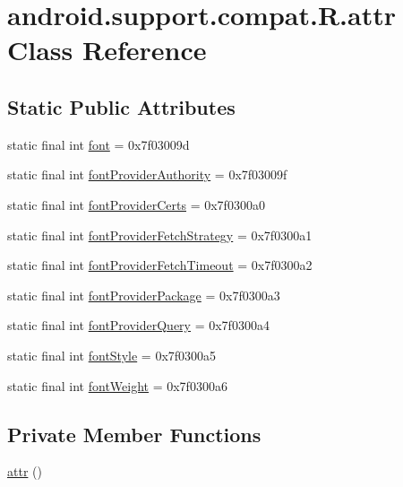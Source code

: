 \hypertarget{classandroid_1_1support_1_1compat_1_1_r_1_1attr}{}\section{android.\+support.\+compat.\+R.\+attr Class Reference}
\label{classandroid_1_1support_1_1compat_1_1_r_1_1attr}
\subsection*{Static Public Attributes}
\begin{DoxyCompactItemize}
\item 
static final int \mbox{\hyperlink{classandroid_1_1support_1_1compat_1_1_r_1_1attr_a81787f6b5888bbbadbced1dcdf540898}{font}} = 0x7f03009d
\item 
static final int \mbox{\hyperlink{classandroid_1_1support_1_1compat_1_1_r_1_1attr_a385b42c0dfc03b03c265fcfd7769c4bd}{font\+Provider\+Authority}} = 0x7f03009f
\item 
static final int \mbox{\hyperlink{classandroid_1_1support_1_1compat_1_1_r_1_1attr_a596b9b8b873c6ad0f117df870c8c3f21}{font\+Provider\+Certs}} = 0x7f0300a0
\item 
static final int \mbox{\hyperlink{classandroid_1_1support_1_1compat_1_1_r_1_1attr_aef6cba42cf72879fa76c23ac333b803c}{font\+Provider\+Fetch\+Strategy}} = 0x7f0300a1
\item 
static final int \mbox{\hyperlink{classandroid_1_1support_1_1compat_1_1_r_1_1attr_ac799f7df13e58e586ee80b9d690de917}{font\+Provider\+Fetch\+Timeout}} = 0x7f0300a2
\item 
static final int \mbox{\hyperlink{classandroid_1_1support_1_1compat_1_1_r_1_1attr_a1f9768a93919a8e73aa7ff92eb3ccccc}{font\+Provider\+Package}} = 0x7f0300a3
\item 
static final int \mbox{\hyperlink{classandroid_1_1support_1_1compat_1_1_r_1_1attr_a520711f2c65e1d68d359126541844b6a}{font\+Provider\+Query}} = 0x7f0300a4
\item 
static final int \mbox{\hyperlink{classandroid_1_1support_1_1compat_1_1_r_1_1attr_aafb47e665f110a6e8fd90833aefd0e1f}{font\+Style}} = 0x7f0300a5
\item 
static final int \mbox{\hyperlink{classandroid_1_1support_1_1compat_1_1_r_1_1attr_ab95e33bc7552ac24227086aae1de1973}{font\+Weight}} = 0x7f0300a6
\end{DoxyCompactItemize}
\subsection*{Private Member Functions}
\begin{DoxyCompactItemize}
\item 
\mbox{\hyperlink{classandroid_1_1support_1_1compat_1_1_r_1_1attr_ab6d46d4f02cbae6e5d468914d3b096a5}{attr}} ()
\end{DoxyCompactItemize}


